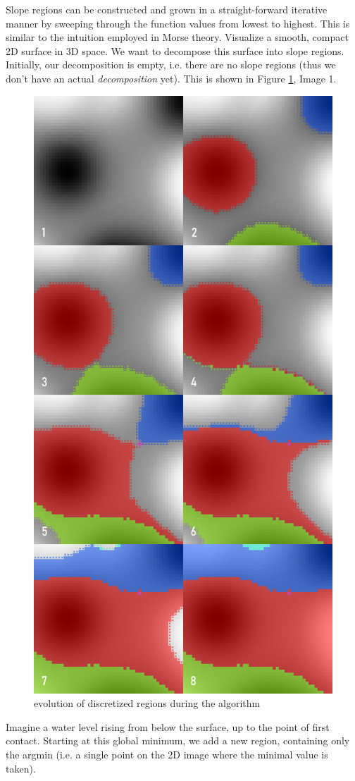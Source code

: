 \documentclass[11pt,twoside,twocolumn,a4paper]{article}
\theoremstyle{plain}
\theoremstyle{definition}
\begin{document}
Slope regions can be constructed and grown in a straight-forward iterative manner by sweeping through the function values from lowest to highest. 
This is similar to the intuition employed in Morse theory\cite{MatsumotoYukio2002AitM}.
Visualize a smooth, compact 2D surface in 3D space.
We want to decompose this surface into slope regions.
Initially, our decomposition is empty, i.e. there are no slope regions (thus we don't have an actual \emph{decomposition} yet).
This is shown in Figure \ref{fig:evolution}, Image 1.

\begin{figure}
\centering
\includegraphics[width=0.70\columnwidth]{img/slope_evolution.png}
\caption{evolution of discretized regions during the algorithm}
\label{fig:evolution}
\end{figure}

Imagine a water level rising from below the surface, up to the point of first contact.
Starting at this global minimum, we add a new region, containing only the argmin (i.e. a single point on the 2D image where the minimal value is taken).
\end{document}
